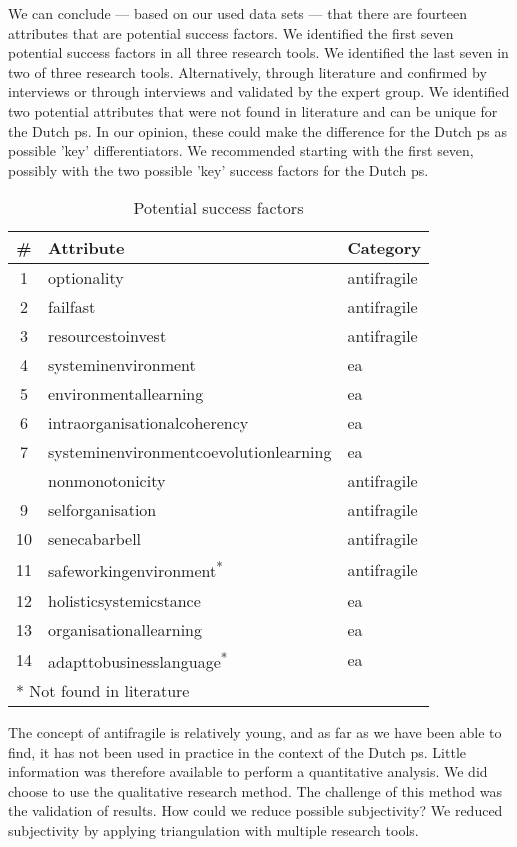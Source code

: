 We can conclude --- based on our used data sets --- that there are fourteen \glspl{attribute} that are potential success factors. We identified the first seven potential success factors in all three research tools. We identified the last seven in two of three research tools. Alternatively, through literature and confirmed by interviews or through interviews and validated by the expert group. We identified two potential attributes that were not found in literature and can be unique for the Dutch \gls{ps}. In our opinion, these could make the difference for the Dutch \gls{ps} as possible 'key' differentiators. We recommended starting with the first seven, possibly with the two possible 'key' success factors for the Dutch \gls{ps}.
\begin{table}[H]
	\centering
	\small
	\begin{tabular}{@{}cll@{}}
		\toprule
		\textbf{\#} & \textbf{Attribute} & \textbf{Category} \\%
		\midrule
		1 & \Gls{optionality} & \Gls{antifragile} \\%
		2 & \Gls{failfast} & \Gls{antifragile} \\%
		3 & \Gls{resourcestoinvest} & \Gls{antifragile} \\%
		4 & \Gls{systeminenvironment} & \gls{ea} \\%
		5 & \Gls{environmentallearning} & \gls{ea} \\%
		6 & \Gls{intraorganisationalcoherency} & \gls{ea} \\%
		7 & \Gls{systeminenvironmentcoevolutionlearning} & \gls{ea} \\%
		\hdashline %
		8 & \Gls{nonmonotonicity} & \Gls{antifragile}  \\%
		9 & \Gls{selforganisation} & \Gls{antifragile}  \\%
		10 & \Gls{senecabarbell} & \Gls{antifragile}  \\%
		11 & \Gls{safeworkingenvironment}\textsuperscript{*} & \Gls{antifragile}  \\%
		12 & \Gls{holisticsystemicstance} & \gls{ea}  \\%
		13 & \Gls{organisationallearning} & \gls{ea}  \\%
		14 & \Gls{adapttobusinesslanguage}\textsuperscript{*} & \gls{ea}  \\%
		\bottomrule
		\multicolumn{2}{l}{* Not found in literature}
	\end{tabular}%
	\caption*{Potential success factors}
	\label{executive:potentialsuccess}%
\end{table}%
The concept of \gls{antifragile} is relatively young, and as far as we have been able to find, it has not been used in practice in the context of the Dutch \gls{ps}. Little information was therefore available to perform a quantitative analysis. We did choose to use the qualitative research method. The challenge of this method was the validation of results. How could we reduce possible subjectivity? We reduced subjectivity by applying triangulation with multiple research tools.

